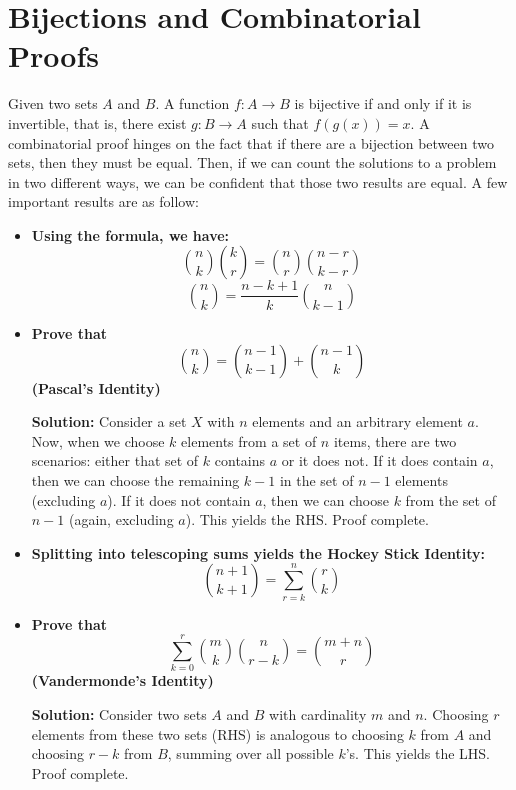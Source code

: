\documentclass[12pt]{article}
\begin{document}
\section{Bijections and Combinatorial Proofs}
Given two sets $A$ and $B$. A function $f: A \rightarrow B$ is bijective if and only if it is invertible, that is, there exist $g: B \rightarrow A$ such that $f(g(x)) = x$. A combinatorial proof hinges on the fact that if there are a bijection between two sets, then they must be equal. Then, if we can count the solutions to a problem in two different ways, we can be confident that those two results are equal. A few important results are as follow:
\begin{itemize}
    \item \textbf{Using the formula, we have:}
    \begin{equation*}
        \binom{n}{k} \binom{k}{r} = \binom{n}{r}\binom{n-r}{k-r}
    \end{equation*}
    \begin{equation*}
        \binom{n}{k} = \dfrac{n-k+1}{k} \binom{n}{k-1}
    \end{equation*}
    \item \textbf{Prove that} $$\binom{n}{k} = \binom{n-1}{k-1} + \binom{n-1}{k}$$ \textbf{(Pascal's Identity)}
    \par \textbf{Solution:} Consider a set $X$ with $n$ elements and an arbitrary element $a$. Now, when we choose $k$ elements from a set of $n$ items, there are two scenarios: either that set of $k$ contains $a$ or it does not. If it does contain $a$, then we can choose the remaining $k-1$ in the set of $n-1$ elements (excluding $a$). If it does not contain $a$, then we can choose $k$ from the set of $n-1$ (again, excluding $a$). This yields the RHS. Proof complete. 
    \item \textbf{Splitting into telescoping sums yields the Hockey Stick Identity:}
    \begin{equation*}
        \binom{n+1}{k+1} = \sum_{r=k}^n \binom{r}{k}
    \end{equation*}
    \item \textbf{Prove that} $$\sum_{k=0}^{r}\binom{m}{k}\binom{n}{r-k} = \binom{m+n}{r}$$ \textbf{(Vandermonde's Identity)}
    \par \textbf{Solution:} Consider two sets $A$ and $B$ with cardinality $m$ and $n$. Choosing $r$ elements from these two sets (RHS) is analogous to choosing $k$ from $A$ and choosing $r-k$ from $B$, summing over all possible $k$'s. This yields the LHS. Proof complete.

\end{itemize}
\end{document}
